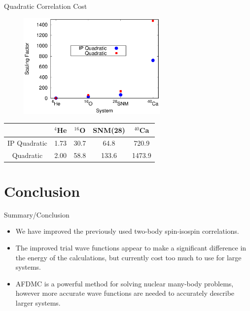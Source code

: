 \documentclass{beamer}
\begin{document}
\begin{frame}{Quadratic Correlation Cost}
\begin{figure}[h]
   \centering
   \includegraphics[width=0.65\textwidth]{scaling.eps}
\end{figure}
\vspace{-0.2cm}
\begin{table}[h!]
   \centering
   \begin{tabular}{ccccc}
      \hline \hline
       & $^{4}$He & $^{16}$O & SNM(28) & $^{40}$Ca \\
      \hline
      IP Quadratic & 1.73 & 30.7 & 64.8 & 720.9 \\
      Quadratic & 2.00 & 58.8 & 133.6 & 1473.9 \\
      \hline \hline
   \end{tabular}
\end{table}
\end{frame}

\section{Conclusion}
\begin{frame}{Summary/Conclusion}
\begin{itemize}
   \item We have improved the previously used two-body spin-isospin correlations.
   \item The improved trial wave functions appear to make a significant difference in the energy of the calculations, but currently cost too much to use for large systems.
   \item AFDMC is a powerful method for solving nuclear many-body problems, however more accurate wave functions are needed to accurately describe larger systems.
\end{itemize}
\end{frame}

\end{document}
